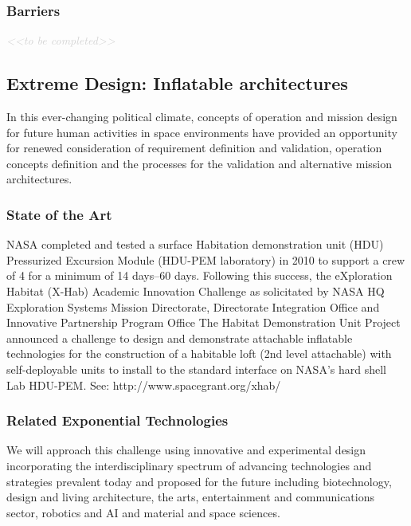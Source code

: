 \documentclass[letter,11pt]{article}
\newcommand{\todo}[1]{\textcolor{lightgray}{\textit{<<#1>>}}}
\newcommand{\tbc}{\begin{center} \todo{to be completed} \end{center}}
\newcommand{\tbcsubsubsection}[1]{ \refstepcounter{subsubsection}%
  \subsubsection*{\thesubsubsection \quad #1} \tbc}
\begin{document}
\tbcsubsubsection{Barriers}

\subsection{Extreme Design: Inflatable architectures}

In this ever-changing political climate, concepts of operation and mission
design for future human activities in space environments have provided an
opportunity for renewed consideration of requirement definition and validation,
operation concepts definition and the processes for the validation and
alternative mission architectures. 

\subsubsection{State of the Art}

NASA completed and tested a surface Habitation demonstration unit (HDU)
Pressurized Excursion Module (HDU-PEM laboratory) in 2010 to support a crew of
4 for a minimum of 14 days--60 days.  Following this success, the eXploration
Habitat (X-Hab) Academic Innovation Challenge as solicitated by NASA HQ
Exploration Systems Mission Directorate, Directorate Integration Office and
Innovative Partnership Program Office The Habitat Demonstration Unit Project
announced a challenge to design and demonstrate attachable inflatable
technologies for the construction of a habitable loft (2nd level attachable)
with self-deployable units to install to the standard interface on NASA's hard
shell Lab HDU-PEM. See: http://www.spacegrant.org/xhab/

\subsubsection{Related Exponential Technologies}

We will approach this challenge using innovative and experimental design incorporating the interdisciplinary spectrum of advancing technologies and strategies prevalent today and proposed for the future including biotechnology, design and living architecture, the arts, entertainment and communications sector, robotics and AI and material and space sciences.
\end{document}
